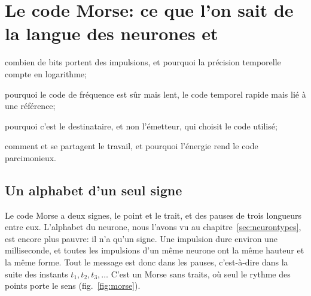 \chapter{Le code Morse: ce que l'on sait de la langue des neurones  et }
\label{sec:code}
\begin{chaptergoals}
\item combien de bits portent des impulsions, et pourquoi la précision temporelle compte en logarithme;
\item pourquoi le code de fréquence est sûr mais lent, le code temporel rapide mais lié à une référence;
\item pourquoi c'est le destinataire, et non l'émetteur, qui choisit le code utilisé;
\item comment  et  se partagent le travail, et pourquoi l'énergie rend le code parcimonieux.
\end{chaptergoals}

\section{Un alphabet d'un seul signe}

Le code Morse a deux signes, le point et le trait, et des pauses de trois longueurs entre eux. L'alphabet du neurone, nous l'avons vu au chapitre~\ref{sec:neurontypes}, est encore plus pauvre: il n'a qu'un signe. Une impulsion dure environ une milliseconde, et toutes les impulsions d'un même neurone ont la même hauteur et la même forme. Tout le message est donc dans les pauses, c'est-à-dire dans la suite des instants $t_1,t_2,t_3,\dots$ C'est un Morse sans traits, où seul le rythme des points porte le sens (fig.~\ref{fig:morse}).

